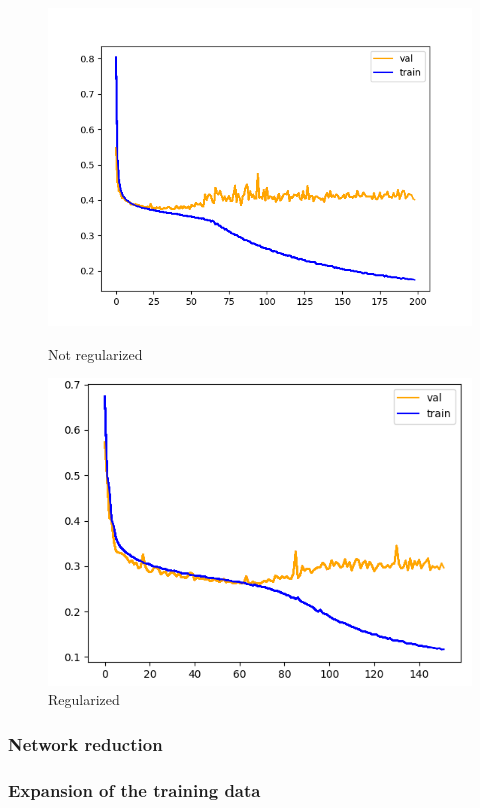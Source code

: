 \begin{figure}[htb]
    \centering
    \begin{minipage}{.5\textwidth}
      \centering
      \includegraphics[width=\linewidth]{bilder/firt-train-overfit.png}
      \caption{Not regularized}
      \label{fig:first-train-overfit}
    \end{minipage}%
    \begin{minipage}{.5\textwidth}
      \centering
      \includegraphics[width=\linewidth]{bilder/first-train-regularized.png}
      \caption{Regularized}
      \label{fig:first-train-regularized}
    \end{minipage}
\end{figure}

\subsubsection{Network reduction}
\subsubsection{Expansion of the training data}
